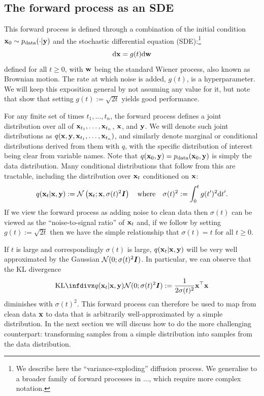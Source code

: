 \subsection{The forward process as an SDE} \label{sec:diffusion-forward-sde}
This forward process is defined through a combination of the initial condition ${\mathbf{x}}_0 \sim p_{\rm{data}}(\cdot|{\mathbf{y}})$ and the stochastic differential equation (SDE):\footnote{We describe here the ``variance-exploding'' diffusion process. We generalise to a broader family of forward processes in ..., which require more complex notation.}
\begin{equation} \label{eq:forward-diffusion}
    \mathrm{d}{\mathbf{x}} = g(t) \mathrm{d}{\mathbf{w}}
\end{equation}
defined for all $t \geq 0$, with ${\mathbf{w}}$ being the standard Wiener process, also known as Brownian motion. The rate at which noise is added, $g(t)$, is a hyperparameter. We will keep this exposition general by not assuming any value for it, but note that \citet{karras2022elucidating} show that setting $g(t) := \sqrt{2t}$ yields good performance.

For any finite set of times $t_1,\ldots,t_n$, the forward process defines a joint distribution over all of ${\mathbf{x}}_{t_1},\ldots,{\mathbf{x}}_{t_n}$, ${\mathbf{x}}$, and ${\mathbf{y}}$. We will denote such joint distributions as $q({\mathbf{x}},{\mathbf{y}},{\mathbf{x}}_{t_1},\ldots,{\mathbf{x}}_{t_n})$, and similarly denote marginal or conditional distributions derived from them with $q$, with the specific distribution of interest being clear from variable names. Note that $q({\mathbf{x}}_0,{\mathbf{y}}) = p_{\rm{data}}({\mathbf{x}}_0,{\mathbf{y}})$ is simply the data distribution. Many conditional distributions that follow from this are tractable, including the distribution over ${\mathbf{x}}_t$ conditioned on ${\mathbf{x}}$:
\begin{equation}
    q({\mathbf{x}}_t|{\mathbf{x}},{\mathbf{y}}) := {\mathcal{N}} \left( {\mathbf{x}}_t; {\mathbf{x}}, \sigma(t)^2 {\bm{I}} \right) \quad \text{where} \quad \sigma(t)^2 := \int_0^t g(t')^2 \mathrm{d}t'.
\end{equation}
If we view the forward process as adding noise to clean data then $\sigma(t)$ can be viewed as the ``noise-to-signal ratio'' of ${\mathbf{x}}_t$ and, if we follow \citet{karras2022elucidating} by setting $g(t) := \sqrt{2t}$ then we have the simple relationship that $\sigma(t) = t$ for all $t\geq0$.

If $t$ is large and correspondingly $\sigma(t)$ is large, $q({\mathbf{x}}_t|{\mathbf{x}},{\mathbf{y}})$ will be very well approximated by the Gaussian ${\mathcal{N}}(0; \sigma(t)^2{\bm{I}})$. In particular, we can observe that the KL divergence
\begin{equation}
    \kl{q(\rvx_t|\rvx,\rvy)}{\gN(0; \sigma(t)^2\mI)} :=\frac{1}{2\sigma(t)^2} \rvx^\top \rvx
\end{equation}
diminishes with $\sigma(t)^2$. This forward process can therefore be used to map from clean data ${\mathbf{x}}$ to data that is arbitrarily well-approximated by a simple distribution. In the next section we will discuss how to do the more challenging counterpart: transforming samples from a simple distribution into samples from the data distribution.

